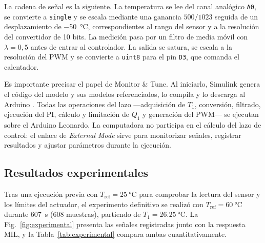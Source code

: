 \documentclass[conference,a4paper,10pt]{IEEEtran}
\newcommand{\Tref}{T_{\mathrm{ref}}}
\begin{document}
La cadena de señal es la siguiente. La temperatura se lee del canal analógico \texttt{A0}, se
convierte a \texttt{single} y se escala mediante una ganancia $500/1023$ seguida de un
desplazamiento de \SI{-50}{\celsius}, correspondientes al rango del sensor y a la resolución del
convertidor de 10 bits. La medición pasa por un filtro de media móvil con $\lambda = 0{,}5$ antes de
entrar al controlador. La salida se satura, se escala a la resolución del PWM y se convierte a
\texttt{uint8} para el pin \texttt{D3}, que comanda el calentador.

Es importante precisar el papel de Monitor \& Tune. Al iniciarlo, Simulink genera el código del
modelo y sus modelos referenciados, lo compila y lo descarga al Arduino
\cite{mw_arduino_workflows}. Todas las operaciones del lazo ---adquisición de $T_1$, conversión,
filtrado, ejecución del PI, cálculo y limitación de $Q_1$ y generación del PWM--- se ejecutan sobre
el Arduino Leonardo. La computadora no participa en el cálculo del lazo de control: el enlace de
\emph{External Mode} sirve para monitorizar señales, registrar resultados y ajustar parámetros
durante la ejecución.

\subsection{Resultados experimentales}

Tras una ejecución previa con $\Tref = \SI{25}{\celsius}$ para comprobar la lectura del sensor y
los límites del actuador, el experimento definitivo se realizó con $\Tref = \SI{60}{\celsius}$
durante \SI{607}{\second} (\num{608} muestras), partiendo de $T_1 = \SI{26.25}{\celsius}$. La Fig.~\ref{fig:experimental} presenta las señales registradas junto
con la respuesta MIL, y la Tabla~\ref{tab:experimental} compara ambas cuantitativamente.
\end{document}

